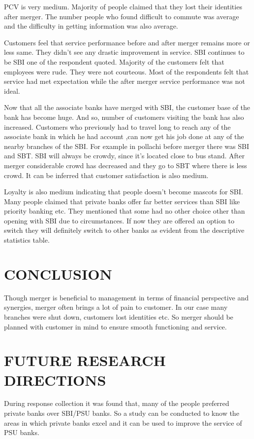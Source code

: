 \documentclass[a4paper, 14pt]{article}
\begin{document}
{PCV is very medium. Majority of people claimed that they lost their identities after merger. The number people who found difficult to commute was average and the difficulty in getting information was also average.

Customers feel that service performance before and after merger remains more or less same. They didn't see any drastic improvement in service. SBI continues to be SBI one of the respondent quoted. Majority of the customers felt that employees were rude. They were not courteous. Most of the respondents felt that service had met expectation while the after merger service performance was not ideal.

Now that all the associate banks have merged with SBI, the customer base of the bank has become huge. And so, number of customers visiting the bank has also increased. Customers who previously had to travel long to reach any of the associate bank in which he had account ,can now get his job done at any of the nearby branches of the SBI. For example in pollachi before merger there was SBI and SBT. SBI will always be crowdy, since it's located close to bus stand. After merger considerable crowd has decreased and they go to SBT where there is less crowd. It can be inferred that customer satisfaction is also medium.

Loyalty is also medium indicating that people doesn't become mascots for SBI. Many people claimed that private banks offer far better services than SBI like priority banking etc. They mentioned that some had no other choice other than opening with SBI due to circumstances. If now they are offered an option to switch they will definitely switch to other banks as evident from the descriptive statistics table.


\section*{CONCLUSION}
\par Though merger is beneficial to management in terms of financial perspective and synergies, merger often brings a lot of pain to customer. In our case many branches were shut down, customers lost identities etc. So merger should be planned with customer in mind to ensure smooth functioning and service.
\section*{FUTURE RESEARCH DIRECTIONS}
\par During response collection it was found that, many of the people preferred private banks over SBI/PSU banks. So a study can be conducted to know the areas in which private banks excel and it can be used to improve the service of PSU banks.
}
\end{document}
